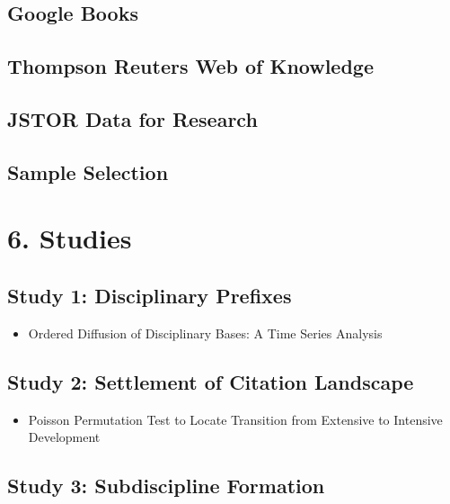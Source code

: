 \documentclass[]{article}
\providecommand{\tightlist}{%
  \setlength{\itemsep}{0pt}\setlength{\parskip}{0pt}}
\begin{document}
\subsection{Google Books}\label{google-books}

\subsection{Thompson Reuters Web of
Knowledge}\label{thompson-reuters-web-of-knowledge}

\subsection{JSTOR Data for Research}\label{jstor-data-for-research}

\subsection{Sample Selection}\label{sample-selection}

\section{6. Studies}\label{studies}

\subsection{Study 1: Disciplinary
Prefixes}\label{study-1-disciplinary-prefixes}

\begin{itemize}
\tightlist
\item
  Ordered Diffusion of Disciplinary Bases: A Time Series Analysis
\end{itemize}

\subsection{Study 2: Settlement of Citation
Landscape}\label{study-2-settlement-of-citation-landscape}

\begin{itemize}
\tightlist
\item
  Poisson Permutation Test to Locate Transition from Extensive to
  Intensive Development
\end{itemize}

\subsection{Study 3: Subdiscipline
Formation}\label{study-3-subdiscipline-formation}
\end{document}
